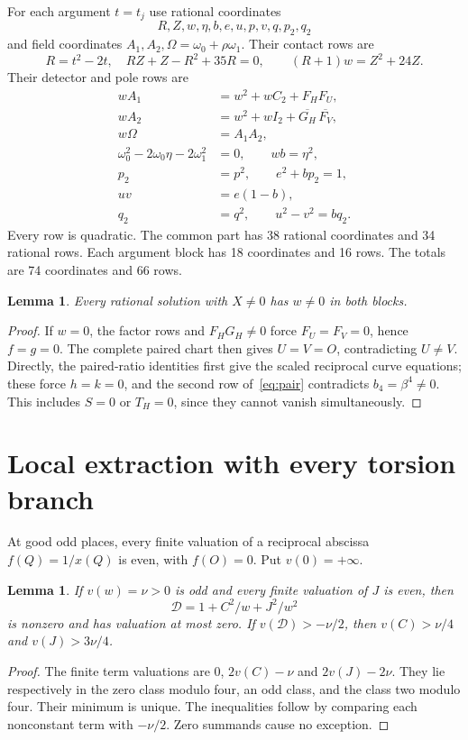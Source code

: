 \documentclass[11pt,a4paper]{article}
\newtheorem{lemma}[theorem]{Lemma}
\begin{document}
For each argument $t=t_j$ use rational coordinates
\[
        R,Z,w,\eta,b,e,u,p,v,q,p_2,q_2
\]
and field coordinates $A_1,A_2,\Omega=\omega_0+\rho\omega_1$.
Their contact rows are
\begin{equation}\label{eq:contactrows}
 R=t^2-2t,\quad RZ+Z-R^2+35R=0,\qquad
 (R+1)w=Z^2+24Z.
\end{equation}
Their detector and pole rows are
\begin{align}
 wA_1&=w^2+wC_2+F_HF_U,\label{eq:factor1}\\
 wA_2&=w^2+wI_2+\overline{G_H}\,\overline{F_V},\label{eq:factor2}\\
 w\Omega&=A_1A_2,\label{eq:product}\\
 \omega_0^2-2\omega_0\eta-2\omega_1^2&=0,
 \qquad wb=\eta^2,\label{eq:tracepole}\\
 p_2&=p^2,\qquad e^2+bp_2=1,\label{eq:pole1}\\
 uv&=e(1-b),\label{eq:pole2}\\
 q_2&=q^2,\qquad u^2-v^2=bq_2.\label{eq:pole3}
\end{align}
Every row is quadratic. The common part has 38 rational coordinates
and 34 rational rows. Each argument block has 18 coordinates and
16 rows. The totals are 74 coordinates and 66 rows.

\begin{lemma}\label{lem:nonzero}
Every rational solution with $X\ne0$ has $w\ne0$ in both blocks.
\end{lemma}
\begin{proof}
If $w=0$, the factor rows and $F_HG_H\ne0$ force
$F_U=F_V=0$, hence $f=g=0$. The complete paired chart then gives
$U=V=O$, contradicting $U\ne V$. Directly, the paired-ratio
identities first give the scaled reciprocal curve equations; these
force $h=k=0$, and the second row of~\eqref{eq:pair} contradicts
$b_4=\beta^4\ne0$. This includes $S=0$ or $T_H=0$, since they
cannot vanish simultaneously.
\end{proof}

\section{Local extraction with every torsion branch}
At good odd places, every finite valuation of a reciprocal abscissa
$f(Q)=1/x(Q)$ is even, with $f(O)=0$. Put $v(0)=+\infty$.

\begin{lemma}\label{lem:factor}
If $v(w)=\nu>0$ is odd and every finite valuation of $J$ is even,
then
\[
                  \mathcal D=1+C^2/w+J^2/w^2
\]
is nonzero and has valuation at most zero. If
$v(\mathcal D)>-\nu/2$, then $v(C)>\nu/4$ and
$v(J)>3\nu/4$.
\end{lemma}
\begin{proof}
The finite term valuations are $0$, $2v(C)-\nu$ and
$2v(J)-2\nu$. They lie respectively in the zero class modulo four,
an odd class, and the class two modulo four. Their minimum is unique.
The inequalities follow by comparing each nonconstant term with
$-\nu/2$. Zero summands cause no exception.
\end{proof}
\end{document}

